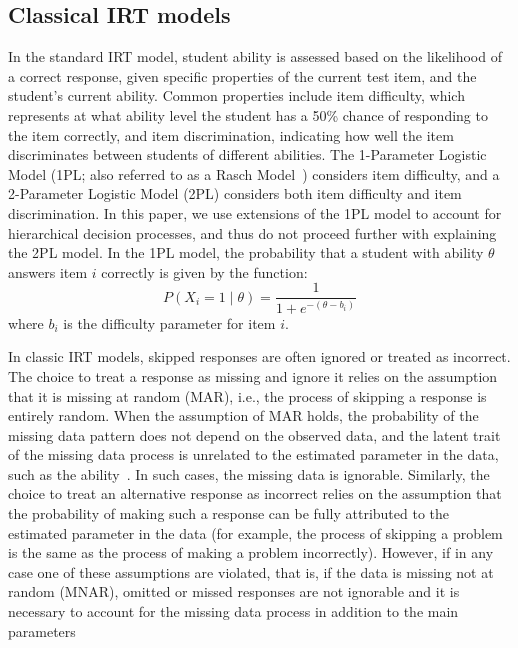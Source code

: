 \documentclass[anonymous,manuscript,review]{acmart}
\begin{document}
\subsection{Classical IRT models}
In the standard IRT model, student ability is assessed based on the likelihood of a correct response, given specific properties of the current test item, and the student's current ability. Common properties include item difficulty, which represents at what ability level the student has a 50\% chance of responding to the item correctly, and item discrimination, indicating how well the item discriminates between students of different abilities. The 1-Parameter Logistic Model (1PL; also referred to as a Rasch Model~\cite{rasch1993probabilistic}) considers item difficulty, and a 2-Parameter Logistic Model (2PL) considers both item difficulty and item discrimination. In this paper, we use extensions of the 1PL model to account for hierarchical decision processes, and thus do not proceed further with explaining the 2PL model. In the 1PL model, the probability that a student with ability $\theta$ answers item $i$ correctly is given by the function: 
\begin{equation}
  P(X_i = 1 \mid \theta) = \frac{1}{1 + e^{-(\theta - b_i)}}
\end{equation}
where $b_i$ is the difficulty parameter for item $i$. 

In classic IRT models, skipped responses are often ignored or treated as incorrect. The choice to treat a response as missing and ignore it relies on the assumption that it is missing at random (MAR), i.e., the process of skipping a response is entirely random. When the assumption of MAR holds, the probability of the missing data pattern does not depend on the observed data, and the latent trait of the missing data process is unrelated to the estimated parameter in the data, such as the ability~\cite{rubin1976inference}. In such cases, the missing data is ignorable. Similarly, the choice to treat an alternative response as incorrect relies on the assumption that the probability of making such a response can be fully attributed to the estimated parameter in the data (for example, the process of skipping a problem is the same as the process of making a problem incorrectly). However, if in any case one of these assumptions are violated, that is, if the data is missing not at random (MNAR), omitted or missed responses are not ignorable and it is necessary to account for the missing data process in addition to the main parameters~\cite{little2019statistical}
\end{document}
